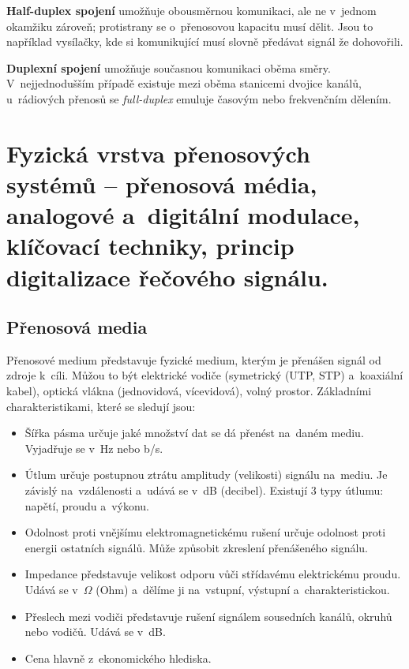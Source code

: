 \textbf{Half-duplex spojení} umožňuje obousměrnou komunikaci, ale ne v~jednom okamžiku zároveň; protistrany se o~přenosovou kapacitu musí dělit. Jsou to například vysílačky, kde si komunikující musí slovně předávat signál že dohovořili.

\textbf{Duplexní spojení} umožňuje současnou komunikaci oběma směry. V~nejjednodušším případě existuje mezi oběma stanicemi dvojice kanálů, u~rádiových přenosů se \emph{full-duplex} emuluje časovým nebo frekvenčním dělením.

\clearpage
\section{Fyzická vrstva přenosových systémů -- přenosová média, analogové a~digitální modulace, klíčovací techniky, princip digitalizace řečového signálu.}

\subsection{Přenosová media}

Přenosové medium představuje fyzické medium, kterým je přenášen signál od zdroje k~cíli. Můžou to být elektrické vodiče (symetrický (UTP, STP) a~koaxiální kabel), optická vlákna (jednovidová, vícevidová), volný prostor.
Základními charakteristikami, které se sledují jsou:

\begin{itemize}[noitemsep]
    \item Šířka pásma určuje jaké množství dat se dá přenést na~daném mediu. Vyjadřuje se v~Hz nebo b/s.
    \item Útlum určuje postupnou ztrátu amplitudy (velikosti) signálu na~mediu. Je závislý na~vzdálenosti a~udává se v~dB (decibel). Existují 3 typy útlumu: napětí, proudu a~výkonu.
    \item Odolnost proti vnějšímu elektromagnetickému rušení určuje odolnost proti energii ostatních signálů. Může způsobit zkreslení přenášeného signálu.
    \item Impedance představuje velikost odporu vůči střídavému elektrickému proudu. Udává se v~$\Omega$ (Ohm) a~dělíme ji na~vstupní, výstupní a~charakteristickou.
    \item Přeslech mezi vodiči představuje rušení signálem sousedních kanálů, okruhů nebo vodičů. Udává se v~dB.
    \item Cena hlavně z~ekonomického hlediska.
\end{itemize}

